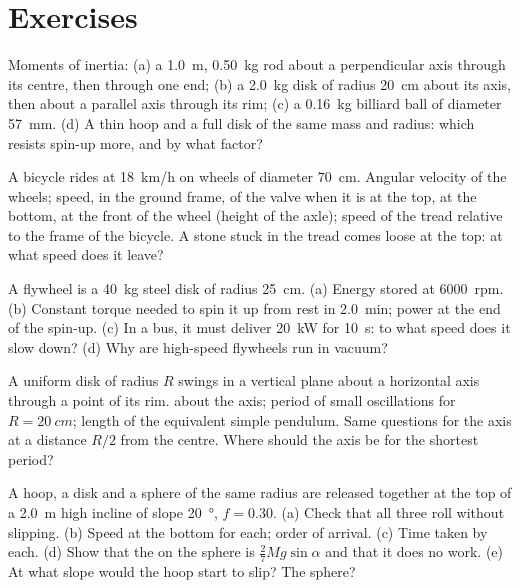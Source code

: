 \section{Exercises}

\begin{exercise}[$\star$]\label{exo:b2:rigid-body-mechanics:1}
Moments of inertia: (a) a \qty{1.0}{m}, \qty{0.50}{kg} rod about a
perpendicular axis through its centre, then through one end; (b) a
\qty{2.0}{kg} disk of radius \qty{20}{cm} about its axis, then about a
parallel axis through its rim; (c) a \qty{0.16}{kg} billiard ball of
diameter \qty{57}{mm}. (d) A thin hoop and a full disk of the same mass
and radius: which resists spin-up more, and by what factor?
\end{exercise}

\begin{exercise}[$\star$]\label{exo:b2:rigid-body-mechanics:2}
A bicycle rides at \qty{18}{km/h} on wheels of diameter \qty{70}{cm}.
Angular velocity of the wheels; speed, in the ground frame, of the
valve when it is at the top, at the bottom, at the front of the wheel
(height of the axle); speed of the tread relative to the frame of the
bicycle. A stone stuck in the tread comes loose at the top: at what
speed does it leave?
\end{exercise}

\begin{exercise}[$\star$]\label{exo:b2:rigid-body-mechanics:3}
A flywheel is a \qty{40}{kg} steel disk of radius \qty{25}{cm}. (a) Energy
stored at \qty{6000}{rpm}. (b) Constant torque needed to spin it up
from rest in \qty{2.0}{min}; power at the end of the spin-up. (c) In a
bus, it must deliver \qty{20}{kW} for \qty{10}{s}: to what speed does it
slow down? (d) Why are high-speed flywheels run in vacuum?
\end{exercise}

\begin{exercise}[$\star$]\label{exo:b2:rigid-body-mechanics:4}
A uniform disk of radius $R$ swings in a vertical plane about a
horizontal axis through a point of its rim.  about
the axis; period of small oscillations for $R = \qty{20}{cm}$; length of
the equivalent simple pendulum. Same questions for the axis at a
distance $R/2$ from the centre. Where should the axis be for the
shortest period?
\end{exercise}

\begin{exercise}[$\star\star$]\label{exo:b2:rigid-body-mechanics:5}
A hoop, a disk and a sphere of the same radius are released together
at the top of a \qty{2.0}{m} high incline of slope \qty{20}{\degree}, $f =
0.30$. (a) Check that all three roll without slipping. (b) Speed at the
bottom for each; order of arrival. (c) Time taken by each. (d) Show that
the  on the sphere is $\tfrac27Mg\sin\alpha$ and that it does
no work. (e) At what slope would the hoop start to slip? The sphere?
\end{exercise}

